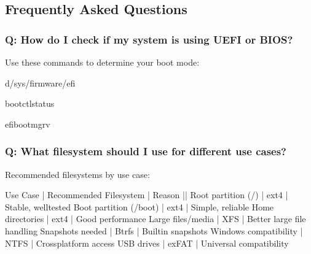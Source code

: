 \documentclass[letterpaper,10pt,english]{sphinxmanual}
\begin{document}
\subsection{Frequently Asked Questions}
\label{\detokenize{ubuntu-setup:frequently-asked-questions}}

\subsubsection{Q: How do I check if my system is using UEFI or BIOS?}
\label{\detokenize{ubuntu-setup:q-how-do-i-check-if-my-system-is-using-uefi-or-bios}}
\sphinxAtStartPar
{} Use these commands to determine your boot mode:

\begin{sphinxVerbatim}[commandchars=\\\{\}]
\PYG{o}{[}\PYGZhy{}d/sys/firmware/efi\PYG{o}{]}

bootctlstatus

efibootmgr\PYGZhy{}v
\end{sphinxVerbatim}


\subsubsection{Q: What filesystem should I use for different use cases?}
\label{\detokenize{ubuntu-setup:q-what-filesystem-should-i-use-for-different-use-cases}}
\sphinxAtStartPar
{} Recommended filesystems by use case:

\begin{sphinxVerbatim}[commandchars=\\\{\}]
Use Case                | Recommended Filesystem | Reason
\PYGZhy{}\PYGZhy{}\PYGZhy{}\PYGZhy{}\PYGZhy{}\PYGZhy{}\PYGZhy{}\PYGZhy{}\PYGZhy{}\PYGZhy{}\PYGZhy{}\PYGZhy{}\PYGZhy{}\PYGZhy{}\PYGZhy{}\PYGZhy{}\PYGZhy{}\PYGZhy{}\PYGZhy{}\PYGZhy{}\PYGZhy{}\PYGZhy{}\PYGZhy{}\PYGZhy{}|\PYGZhy{}\PYGZhy{}\PYGZhy{}\PYGZhy{}\PYGZhy{}\PYGZhy{}\PYGZhy{}\PYGZhy{}\PYGZhy{}\PYGZhy{}\PYGZhy{}\PYGZhy{}\PYGZhy{}\PYGZhy{}\PYGZhy{}\PYGZhy{}\PYGZhy{}\PYGZhy{}\PYGZhy{}\PYGZhy{}\PYGZhy{}\PYGZhy{}\PYGZhy{}\PYGZhy{}|\PYGZhy{}\PYGZhy{}\PYGZhy{}\PYGZhy{}\PYGZhy{}\PYGZhy{}\PYGZhy{}\PYGZhy{}\PYGZhy{}\PYGZhy{}\PYGZhy{}\PYGZhy{}\PYGZhy{}\PYGZhy{}\PYGZhy{}\PYGZhy{}\PYGZhy{}\PYGZhy{}
Root partition (/)      | ext4                  | Stable, well\PYGZhy{}tested
Boot partition (/boot)  | ext4                  | Simple, reliable
Home directories        | ext4                  | Good performance
Large files/media       | XFS                   | Better large file handling
Snapshots needed        | Btrfs                 | Built\PYGZhy{}in snapshots
Windows compatibility   | NTFS                  | Cross\PYGZhy{}platform access
USB drives             | exFAT                 | Universal compatibility
\end{sphinxVerbatim}
\end{document}
